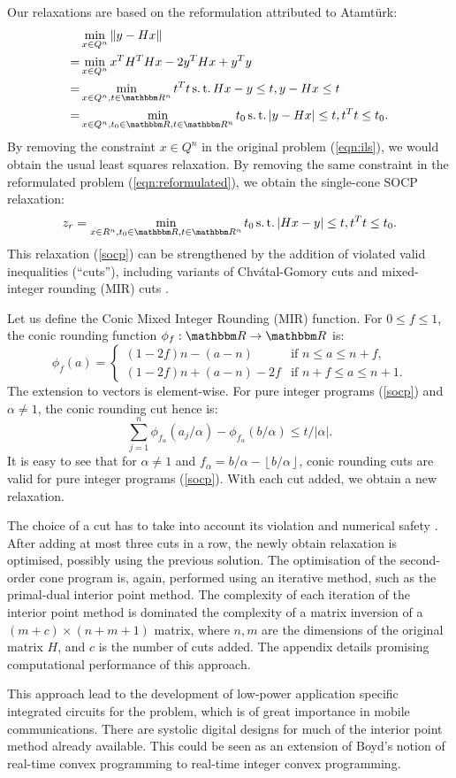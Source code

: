 \documentclass{report}
\begin{document}
Our relaxations are based on the reformulation attributed to Atamt{\" u}rk:
\begin{align}
& \min_{x \in Q^n} \norm{y - Hx} \label{eqn:ils} \\
= & \min_{x \in Q^n} x^T H^T H x - 2 y^T H x + y^T y \\
= & \min_{x \in Q^n, t \in \R^n} t^T t \st Hx - y \le t, y - Hx \le t \\
= & \min_{x \in Q^n, t_0 \in \R, t \in \R^n} t_0 \st |y - Hx| \le t, t^T
t \le t_0. \label{eqn:reformulated}
\end{align}
By removing the constraint $x \in Q^n$ in the original problem (\ref{eqn:ils}),
we would obtain the usual least squares relaxation.
By removing the same constraint in the reformulated problem (\ref{eqn:reformulated}),
we obtain the single-cone SOCP relaxation:
\begin{align}
\label{socp}
z_r = \min_{x \in R^n, t_0 \in \R, t \in \R^n } t_0 \st |Hx - y| \le t, t^T t \le t_0.
\end{align}
This relaxation (\ref{socp}) can be strengthened by the addition of
violated valid inequalities (``cuts''), including variants of
Chv{\'a}tal-Gomory cuts \cite{Cezik2005} and mixed-integer rounding (MIR)
cuts \cite{Atamturk2007}.

Let us define the Conic Mixed Integer Rounding (MIR) function.
For $0 \le f \le 1$, the conic rounding function $\phi_f : \R \to \R$ is:
$$\phi_f(a) = \begin{cases} (1 - 2f)n - (a - n) & \text{if $n \le a \le n + f$,} \\
(1 - 2f)n + (a - n) - 2f &\text{if $n + f \le a \le n + 1$.}
\end{cases}$$
The extension to vectors is element-wise.
For pure integer programs (\ref{socp}) and $\alpha \ne 1$, the conic
rounding cut hence is:
$$\sum_{j = 1}^{n} \phi_{f_{\alpha}}(a_j / \alpha) - \phi_{f_{\alpha}}(b
/ \alpha) \le t / |\alpha|.
$$
It is easy to see that for $\alpha \ne 1$ and $f_{\alpha} = b/\alpha -
\left\lfloor {b / \alpha} \right\rfloor$, conic rounding cuts are valid
for pure integer programs (\ref{socp}).
With each cut added, we obtain a new relaxation.

The choice of a cut has to take into account its violation and numerical
safety \cite{Cook2009}. After adding at most three cuts in a row, the
newly obtain relaxation is optimised, possibly using the previous
solution. The optimisation of the second-order cone program is, again,
performed using an iterative method, such as the primal-dual interior
point method.
The complexity of each iteration of the interior point method is
dominated the complexity of a matrix inversion of a $(m+c) \times (n+ m +
1)$ matrix, where $n,m$ are the dimensions of the original matrix $H$,
and $c$ is the number of cuts added. The appendix details promising
computational performance of this approach.

This approach lead to the development of low-power application specific
integrated circuits for the problem, which is of great importance in
mobile communications. There are systolic digital designs for much of the
interior point method already available.
This could be seen as an extension of Boyd's notion of real-time convex
programming to real-time integer convex programming.
\end{document}
